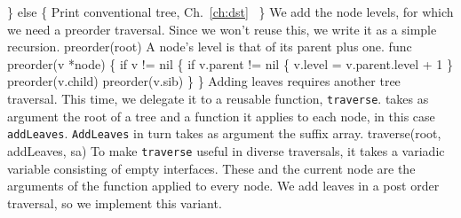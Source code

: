 \} else \{
          \LA{}Print conventional tree, Ch.~\ref{ch:dst}~{\nwtagstyle{}}\RA{}
\}
\nwendcode{}\nwdocspar
We add the node levels, for which we need a preorder traversal. Since
we won't reuse this, we write it as a simple recursion.
\nwenddocs{}\endmoddef\nwstartdeflinemarkup{}\nwenddeflinemarkup
preorder(root)
\nwendcode{}\nwdocspar
A node's level is that of its parent plus one.
\nwenddocs{}\plusendmoddef\nwstartdeflinemarkup{}\nwenddeflinemarkup
func preorder(v *node) \{
          if v != nil \{
                  if v.parent != nil \{
                          v.level = v.parent.level + 1
                  \}
                  preorder(v.child)
                  preorder(v.sib)
          \}
\}
\nwendcode{}\nwdocspar
Adding leaves requires another tree traversal. This time, we delegate
it to a reusable function, \texttt{traverse}.  takes as
argument the root of a tree and a function it applies to each node, in
this case \texttt{addLeaves}. \texttt{AddLeaves} in turn takes as
argument the suffix array.
\nwenddocs{}\endmoddef\nwstartdeflinemarkup{}\nwenddeflinemarkup
traverse(root, addLeaves, sa)
\nwendcode{}\nwdocspar
To make \texttt{traverse} useful in diverse traversals, it takes a
variadic variable consisting of empty interfaces. These and the
current node are the arguments of the function applied to every
node. We add leaves in a post order traversal, so we implement this
variant.
\nwenddocs{}\plusendmoddef\nwstartdeflinemarkup{}\nwenddeflinemarkup
